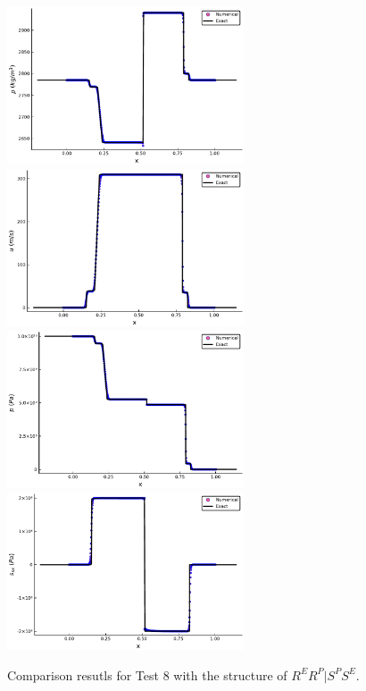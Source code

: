 \documentclass[review]{elsarticle}
\numberwithin{equation}{section}
\numberwithin{table}{section}
\begin{document}
\begin{figure}[ht]
  \centering

  \includegraphics[width= 7cm] {case9rho.pdf}
  \includegraphics[width= 7cm] {case9u.pdf}
  \includegraphics[width= 7cm] {case9p.pdf}
  \includegraphics[width= 7cm] {case9sxx.pdf}

    \caption{Comparison resutls for Test 8 with the structure of $R^ER^P|S^PS^E$.  }
  \label{fig:case9}
\end{figure}
\end{document}
